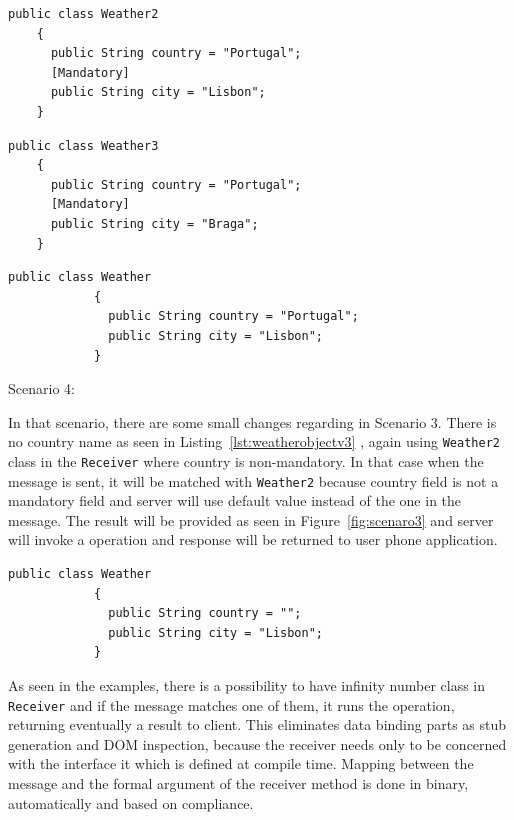 \begin{lstlisting}[caption=Weather2 object in Receiver, label=lst:Weather2Ob]
  public class Weather2
    {
      public String country = "Portugal";
      [Mandatory]
      public String city = "Lisbon";
    }
\end{lstlisting}
\begin{lstlisting}[caption=Weather3 object in Receiver, label=lst:Weather3Ob]
  public class Weather3
    {
      public String country = "Portugal";
      [Mandatory]
      public String city = "Braga";
    }
\end{lstlisting}
\begin{lstlisting}[caption=Simple weather object class, label=lst:weatherobjectv2]
          public class Weather
            {
              public String country = "Portugal";
              public String city = "Lisbon";
            }
\end{lstlisting}

Scenario 4:

In that scenario, there are some small changes regarding in Scenario 3. There is no country name as seen in Listing~\ref{lst:weatherobjectv3} , again using {\tt Weather2} class in the {\tt Receiver} where country is non-mandatory. In that case when the message is sent, it will be matched with {\tt Weather2} because country field is not a mandatory field and server will use default value instead of the one in the message. The result will be provided as seen in Figure~\ref{fig:scenaro3} and server will invoke a operation and response will be returned to user phone application.

\begin{lstlisting}[caption=Simple weather object class for Scenario 4, label=lst:weatherobjectv3]
          public class Weather
            {
              public String country = "";
              public String city = "Lisbon";
            }

\end{lstlisting}

As seen in the examples, there is a possibility to have infinity number class in {\tt Receiver} and if the message matches one of them, it runs the operation, returning eventually a result to client. This eliminates data binding parts as stub generation and DOM inspection, because the receiver needs only to be concerned with the interface it which is defined at compile time. Mapping between the message and the formal argument of the receiver method is done in binary, automatically and based on compliance.

